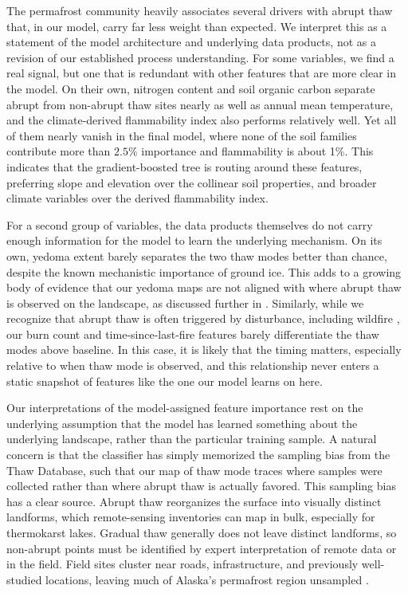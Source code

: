 \documentclass[../main.tex]{subfiles}
\begin{document}
The permafrost community heavily associates several drivers with abrupt thaw that, in our model, carry far less weight than expected. We interpret this as a statement of the model architecture and underlying data products, not as a revision of our established process understanding. For some variables, we find a real signal, but one that is redundant with other features that are more clear in the model. On their own, nitrogen content and soil organic carbon separate abrupt from non-abrupt thaw sites nearly as well as annual mean temperature, and the climate-derived flammability index also performs relatively well. Yet all of them nearly vanish in the final model, where none of the soil families contribute more than $2.5\%$ importance and flammability is about 1\%. This indicates that the gradient-boosted tree is routing around these features, preferring slope and elevation over the collinear soil properties, and broader climate variables over the derived flammability index.

For a second group of variables, the data products themselves do not carry enough information for the model to learn the underlying mechanism. On its own, yedoma extent barely separates the two thaw modes better than chance, despite the known mechanistic importance of ground ice. This adds to a growing body of evidence that our yedoma maps are not aligned with where abrupt thaw is observed on the landscape, as discussed further in . Similarly, while we recognize that abrupt thaw is often triggered by disturbance, including wildfire \citep{jones2015recent}, our burn count and time-since-last-fire features barely differentiate the thaw modes above baseline. In this case, it is likely that the timing matters, especially relative to when thaw mode is observed, and this relationship never enters a static snapshot of features like the one our model learns on here.

Our interpretations of the model-assigned feature importance rest on the underlying assumption that the model has learned something about the underlying landscape, rather than the particular training sample. A natural concern is that the classifier has simply memorized the sampling bias from the Thaw Database, such that our map of thaw mode traces where samples were collected rather than where abrupt thaw is actually favored. This sampling bias has a clear source. Abrupt thaw reorganizes the surface into visually distinct landforms, which remote-sensing inventories can map in bulk, especially for thermokarst lakes. Gradual thaw generally does not leave distinct landforms, so non-abrupt points must be identified by expert interpretation of remote data or in the field. Field sites cluster near roads, infrastructure, and previously well-studied locations, leaving much of Alaska's permafrost region unsampled \citep{metcalfe2018patchy, webb2026comprehensive}.
\end{document}
